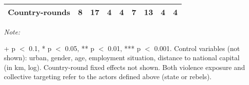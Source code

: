 \begin{table}[!h]
{\begin{threeparttable}
\begin{tabular}[t]{lcccccccc}
Country-rounds & 8 & 17 & 4 & 4 & 7 & 13 & 4 & 4\\
\bottomrule
\end{tabular}
\begin{tablenotes}[para]
\item \textit{Note: } 
\item + p $<$ 0.1, * p $<$ 0.05, ** p $<$ 0.01, *** p $<$ 0.001. Control variables (not shown): urban, gender, age, employment situation, distance to national capital (in km, log). Country-round fixed effects not shown. Both violence exposure and collective targeting refer to the actors defined above (state or rebels).
\end{tablenotes}
\end{threeparttable}}
\end{table}
